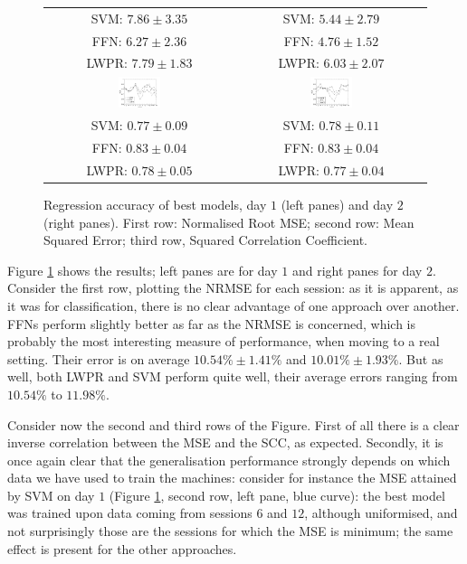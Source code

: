 \begin{figure}[!ht]
\begin{tabular}{cc}
     SVM: $7.86 \pm 3.35$ &  SVM: $5.44 \pm 2.79$ \\
     FFN: $6.27 \pm 2.36$ &  FFN: $4.76 \pm 1.52$ \\
    LWPR: $7.79 \pm 1.83$ & LWPR: $6.03 \pm 2.07$ \\
    \includegraphics[width=0.23\textwidth]{figs/fig_SCC_regr_resCrossBestOnDay1.png} &
    \includegraphics[width=0.23\textwidth]{figs/fig_SCC_regr_resCrossBestOnDay2.png} \\
     SVM: $0.77 \pm 0.09$ &  SVM: $0.78 \pm 0.11$ \\
     FFN: $0.83 \pm 0.04$ &  FFN: $0.83 \pm 0.04$ \\
    LWPR: $0.78 \pm 0.05$ & LWPR: $0.77 \pm 0.04$ \\
  \end{tabular}
  \caption{Regression accuracy of best models, day $1$ (left panes)
    and day $2$ (right panes). First row: Normalised Root MSE; second
    row: Mean Squared Error; third row, Squared Correlation Coefficient.}
  \label{fig:best_regr}
\end{figure}

Figure \ref{fig:best_regr} shows the results; left panes are for day
$1$ and right panes for day $2$. Consider the first row, plotting the
NRMSE for each session: as it is apparent, as it was for
classification, there is no clear advantage of one approach over
another. FFNs perform slightly better as far as the NRMSE is concerned,
which is probably the most interesting measure of performance, when
moving to a real setting. Their error is on average $10.54\% \pm
1.41\%$ and $10.01\% \pm 1.93\%$. But as well, both LWPR and SVM
perform quite well, their average errors ranging from $10.54\%$ to
$11.98\%$.

Consider now the second and third rows of the Figure. First of all
there is a clear inverse correlation between the MSE and the SCC, as
expected. Secondly, it is once again clear that the generalisation
performance strongly depends on which data we have used to train the
machines: consider for instance the MSE attained by SVM on day $1$
(Figure \ref{fig:best_regr}, second row, left pane, blue curve): the
best model was trained upon data coming from sessions $6$ and $12$,
although uniformised, and not surprisingly those are the sessions for
which the MSE is minimum; the same effect is present for the other
approaches.

